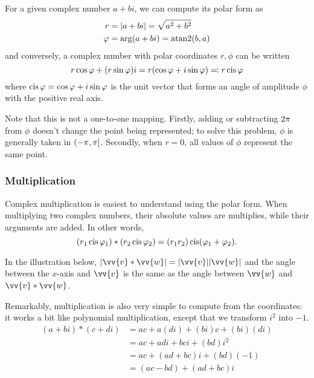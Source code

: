 
For a given complex number $a+bi$, we can compute its polar form as
\begin{align*}
r &= |a+bi| = \sqrt{a^2+b^2}\\
\varphi &= \arg(a+bi) = \operatorname{atan2}(b,a)
\end{align*}
and conversely, a complex number with polar coordinates $r,\phi$ can be written
\[r\cos\varphi+(r\sin\varphi)i = r(\cos\varphi + i\sin\varphi) \eqqcolon r\operatorname{cis}\varphi\]
where $\operatorname{cis}\varphi = \cos\varphi+i\sin\varphi$ is the unit vector that forms an angle of amplitude $\phi$ with the positive real axis.

Note that this is not a one-to-one mapping. Firstly, adding or subtracting $2\pi$ from $\phi$ doesn't change the point being represented; to solve this problem, $\phi$ is generally taken in $(-\pi,\pi]$. Secondly, when $r=0$, all values of $\phi$ represent the same point.

\subsubsection{Multiplication}

Complex multiplication is easiest to understand using the polar form. When multiplying two complex numbers, their absolute values are multiplies, while their arguments are added. In other words,
\[(r_1\operatorname{cis}\varphi_1) \ast (r_2\operatorname{cis}\varphi_2) = (r_1r_2) \operatorname{cis} (\varphi_1+\varphi_2).\]

In the illustration below, $|\vv{v}\ast\vv{w}| = |\vv{v}||\vv{w}|$ and the angle between the $x$-axis and $\vv{v}$ is the same as the angle between $\vv{w}$ and $\vv{v}\ast\vv{w}$.


Remarkably, multiplication is also very simple to compute from the coordinates: it works a bit like polynomial multiplication, except that we transform $i^2$ into $-1$.
\begin{align*}
(a+bi)\ast(c+di) &= ac + a(di) + (bi)c + (bi)(di)\\
&= ac + adi + bci + (bd)i^2\\
&= ac + (ad+bc)i + (bd)(-1)\\
&= (ac-bd) + (ad+bc)i
\end{align*}


